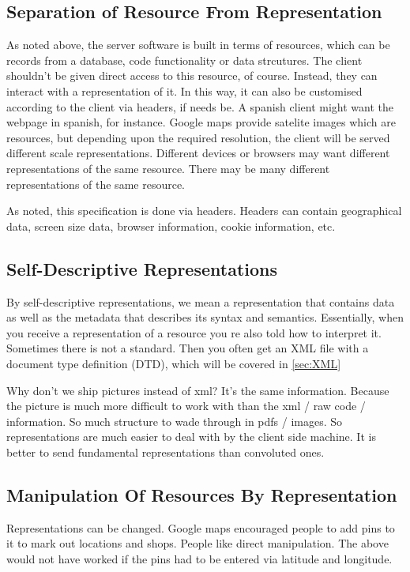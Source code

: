\documentclass[11pt]{article}
\begin{document}
\subsection{Separation of Resource From Representation} 

As noted above, the server software is built in terms of resources, which can be records from a database, code functionality or data strcutures. The client shouldn't be given direct access to this resource, of course. Instead, they can interact with a representation of it. In this way, it can also be customised according to the client via headers, if needs be. A spanish client might want the webpage in spanish, for instance. Google maps provide satelite images which are resources, but depending upon the required resolution, the client will be served different scale representations. Different devices or browsers may want different representations of the same resource. There may be many different representations of the same resource.

As noted, this specification is done via headers. Headers can contain geographical data, screen size data, browser information, cookie information, etc.

\subsection{Self-Descriptive Representations}

By self-descriptive representations, we mean a representation that contains data as well as the metadata that describes its syntax and semantics. Essentially, when you receive a representation of a resource you re also told how to interpret it. Sometimes there is not a standard. Then you often get an XML file with a document type definition (DTD), which will be covered in \ref{sec:XML}

Why don’t we ship pictures instead of xml? It’s the same information. Because the picture is much more difficult to work with than the xml / raw code / information. So much structure to wade through in pdfs / images. So representations are much easier to deal with by the client side machine. It is better to send fundamental representations than convoluted ones.

\subsection{Manipulation Of Resources By Representation}
Representations can be changed. Google maps encouraged people to add pins to it to mark out locations and shops. People like direct manipulation. The above would not have worked if the pins had to be entered via latitude and longitude.
\end{document}
